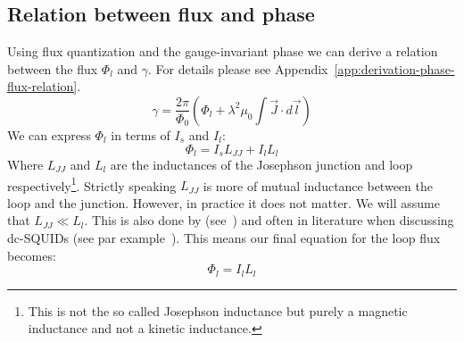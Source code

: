 \subsection{Relation between flux and phase}
\label{sec:flux-phase-relation}
Using flux quantization and the gauge-invariant phase we can derive a relation between the flux $\Phi_l$ and $\gamma$. For details please see Appendix~\ref{app:derivation-phase-flux-relation}.
\begin{equation}
	\gamma = \frac{2\pi}{\Phi_0}\left(\Phi_l + \lambda^2\mu_0 \int \vec{J}\cdot d \vec{l} \right)
	\label{eqn:phase-flux-relation}
\end{equation}
We can express $\Phi_l$ in terms of $I_s$ and $I_l$:
\begin{equation}
	\Phi_l = I_sL_{JJ}  + I_lL_l
\end{equation}
Where $L_{JJ}$ and $L_l$ are the inductances of the Josephson junction and loop respectively\footnote{This is not the so called Josephson inductance but purely a magnetic inductance and not a kinetic inductance.}. Strictly speaking $L_{JJ}$ is more of mutual inductance between the loop and the junction. However, in practice it does not matter. We will assume that $L_{JJ} \ll L_l$. This is also done by \citeauthor{frolovMeasurementCurrentPhaseRelation2004} (see~\cite{frolovCurrentphaseRelationsJosephson2005,frolovMeasurementCurrentPhaseRelation2004}) and often in literature when discussing dc-SQUIDs (see par example~\cite{clarkeSQUIDHandbook2004}). This means our final equation for the loop flux becomes:
\begin{equation}
	\Phi_l = I_lL_l
\end{equation}


